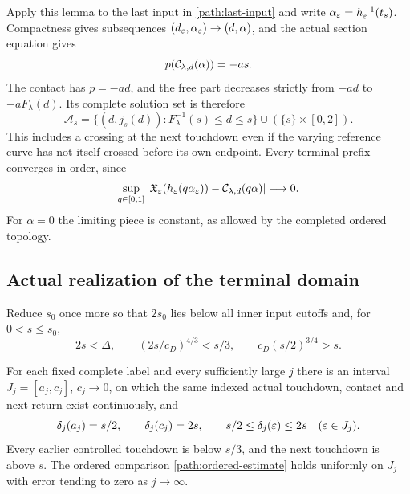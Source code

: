 Apply this lemma to the last input in \eqref{path:last-input} and
write $\alpha_\varepsilon=h_\varepsilon^{-1}(t_s)$.  Compactness gives
subsequences $(d_\varepsilon,\alpha_\varepsilon)\to(d,\alpha)$, and the actual
section equation gives
\begin{equation}
 p(\mathcal C_{\lambda,d}(\alpha))=-as.
 \label{path:actual-stop-equation}
\end{equation}
The contact has $p=-ad$, and the free part decreases strictly from
$-ad$ to $-aF_\lambda(d)$.  Its complete solution set is therefore
\begin{equation}
 \mathcal A_s=
 \{(d,j_s(d)):F_\lambda^{-1}(s)\le d\le s\}
                   \cup(\{s\}\times[0,2]).
 \label{path:terminal-domain}
\end{equation}
This includes a crossing at the next touchdown even if the varying
reference curve has not itself crossed before its own endpoint.
Every terminal prefix converges in order, since
\begin{equation}
 \sup_{q\in[0,1]}
 |\mathfrak X_\varepsilon(h_\varepsilon(q\alpha_\varepsilon))
                       -\mathcal C_{\lambda,d}(q\alpha)|\longrightarrow0.
 \label{path:terminal-prefix}
\end{equation}
For $\alpha=0$ the limiting piece is constant, as allowed by the
completed ordered topology.

\subsection{Actual realization of the terminal domain}

Reduce $s_0$ once more so that $2s_0$ lies below all inner input
cutoffs and, for $0<s\le s_0$,
\begin{equation}
 2s<\Delta,\qquad (2s/c_D)^{4/3}<s/3,\qquad
 c_D(s/2)^{3/4}>s.
 \label{path:scan-margins}
\end{equation}

\begin{lemma}
\label{path:continuous-sweep}
For each fixed complete label and every sufficiently large $j$
there is an interval $J_j=[a_j,c_j]$, $c_j\to0$, on which the same
indexed actual touchdown, contact and next return exist continuously,
and
\begin{equation}
 \delta_j(a_j)=s/2,\qquad\delta_j(c_j)=2s,
 \qquad s/2\le\delta_j(\varepsilon)\le2s\quad(\varepsilon\in J_j).
 \label{path:scan-band}
\end{equation}
Every earlier controlled touchdown is below $s/3$, and the next
touchdown is above $s$.  The ordered comparison
\eqref{path:ordered-estimate} holds uniformly on $J_j$ with error
tending to zero as $j\to\infty$.
\end{lemma}

